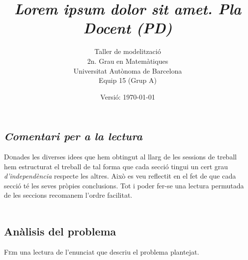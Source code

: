 \documentclass[10pt,twocolumn]{article}
\title{\emph{\color{redviolet!75!black} Lorem ipsum dolor sit amet.  Pla Docent {(PD)}}}
\author{ Taller de modelització \\ 2n. Grau en  Matemàtiques \\ Universitat Autònoma de Barcelona \\ Equip 15 (Grup A)\\ }
\date{Versió: \today}
\newcommand{\esp}{\text{ }}
\begin{document}
	
\tableofcontents
\vspace{5mm}
\begin{tcolorbox}[colframe=white,colback=redviolet!20,sharp corners=all,size=minimal,halign=center,valign=center]
	\section{\textit{Comentari per a la lectura}}
\end{tcolorbox}
\lettrine{D}onades les  diverses idees  que hem obtingut al llarg de les sessions de treball hem estructurat el treball de tal forma que cada secció tingui un cert grau \textit{d'independència} respecte les altres. Això es veu reflectit en el fet de que cada secció té les seves pròpies conclusions. Tot i poder fer-se una lectura permutada de les seccions recomanem l'ordre facilitat. 
\\ 
\newpage
$$
\esp
$$
\\ 
\newpage
\begin{tcolorbox}[colframe=white,colback=redviolet!20,sharp corners=all,size=minimal,halign=center,valign=center]
\section{Anàlisis del problema}
\end{tcolorbox}
\lettrine{F}em una lectura de l'enunciat que descriu el problema plantejat. 

\vspace{5mm}
\end{document}
